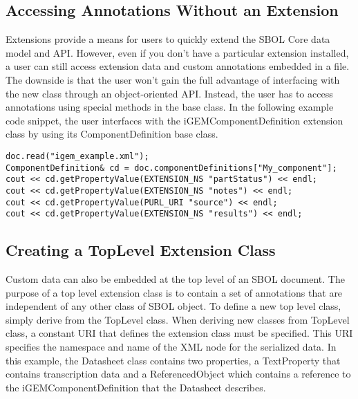 \subsection*{Accessing Annotations Without an Extension}
Extensions provide a means for users to quickly extend the SBOL Core data model and API. However, even if you don't have a particular extension installed, a user can still access extension data and custom annotations embedded in a file. The downside is that the user won't gain the full advantage of interfacing with the new class through an object-oriented API. Instead, the user has to access annotations using special methods in the base class. In the following example code snippet, the user interfaces with the iGEMComponentDefinition extension class by using its ComponentDefinition base class. 

\vspace{\abovedisplayskip}
\begin{minipage}{0.95\textwidth} 
\begin{lstlisting}
doc.read("igem_example.xml");
ComponentDefinition& cd = doc.componentDefinitions["My_component"];
cout << cd.getPropertyValue(EXTENSION_NS "partStatus") << endl;
cout << cd.getPropertyValue(EXTENSION_NS "notes") << endl;
cout << cd.getPropertyValue(PURL_URI "source") << endl;
cout << cd.getPropertyValue(EXTENSION_NS "results") << endl;
\end{lstlisting}
\end{minipage}
    
\subsection*{Creating a TopLevel Extension Class}
Custom data can also be embedded at the top level of an SBOL document. The purpose of a top level extension class is to contain a set of annotations that are independent of any other class of SBOL object. To define a new top level class, simply derive from the TopLevel class. When deriving new classes from TopLevel class, a constant URI that defines the extension class must be specified. This URI specifies the namespace and name of the XML node for the serialized data. In this example, the Datasheet class contains two properties, a TextProperty that contains transcription data and a ReferencedObject which contains a reference to the iGEMComponentDefinition that the Datasheet describes.

